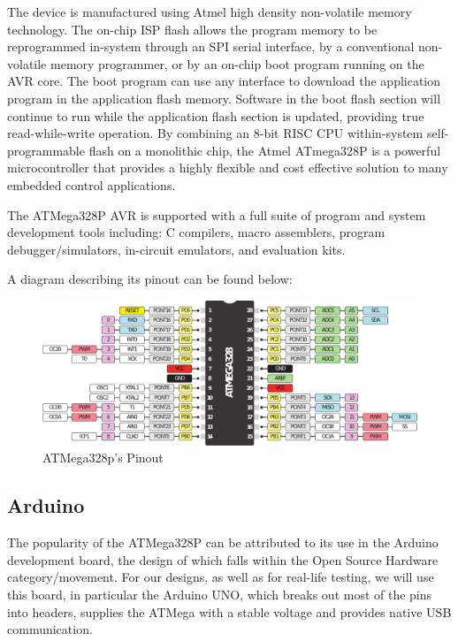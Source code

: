 The device is manufactured using Atmel high density non-volatile memory technology. The on-chip ISP flash allows the program memory to be reprogrammed in-system through an SPI serial interface, by a conventional non-volatile memory programmer, or by an on-chip boot program running on the AVR core. The boot program can use any interface to download the application program in the application flash memory. Software in the boot flash section will continue to run while the application flash section is updated, providing true read-while-write operation. By combining an 8-bit RISC CPU within-system self-programmable flash on a monolithic chip, the Atmel ATmega328P is a powerful microcontroller that provides a highly flexible and cost effective solution to many embedded control applications.\medskip

The ATMega328P AVR is supported with a full suite of program and system development tools including: C compilers, macro assemblers, program debugger/simulators, in-circuit emulators, and evaluation kits.~\autocite{ATMEGA328P}\medskip

A diagram describing its pinout can be found below:

\begin{figure}[H]
    \centering
    \includegraphics[scale = 0.55]{Graphics/MICROS/Practice 1/ARDUINO/ATMEGA328P_PINOUT.pdf}
    \caption{ATMega328p's Pinout~\autocite{ATMEGA328P_PINOUT}}
    \label{fig:ATMEGA328P_PINOUT}
\end{figure}


\subsection{Arduino}

The popularity of the ATMega328P can be attributed to its use in the Arduino development board, the design of which falls within the Open Source Hardware category/movement. For our designs, as well as for real-life testing, we will use this board, in particular the Arduino UNO, which breaks out most of the pins into headers, supplies the ATMega with a stable voltage and provides native USB communication.\medskip

